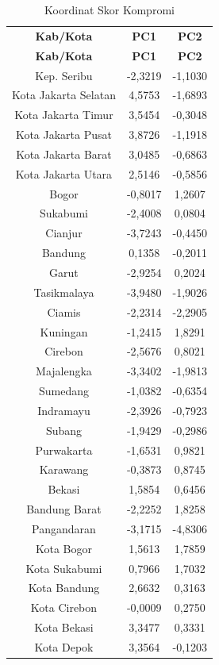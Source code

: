 \begin{longtable}{|c|c|c|}
\caption{Koordinat Skor Kompromi} \label{tab:scores} \\\\
\hline
\textbf{Kab/Kota} & \textbf{PC1} & \textbf{PC2} \\
\hline
\endfirsthead
\hline
\textbf{Kab/Kota} & \textbf{PC1} & \textbf{PC2} \\
\hline
\endhead
\hline
\endfoot
Kep. Seribu & -2,3219 & -1,1030 \\
Kota Jakarta Selatan & 4,5753 & -1,6893 \\
Kota Jakarta Timur & 3,5454 & -0,3048 \\
Kota Jakarta Pusat & 3,8726 & -1,1918 \\
Kota Jakarta Barat & 3,0485 & -0,6863 \\
Kota Jakarta Utara & 2,5146 & -0,5856 \\
Bogor & -0,8017 & 1,2607 \\
Sukabumi & -2,4008 & 0,0804 \\
Cianjur & -3,7243 & -0,4450 \\
Bandung & 0,1358 & -0,2011 \\
Garut & -2,9254 & 0,2024 \\
Tasikmalaya & -3,9480 & -1,9026 \\
Ciamis & -2,2314 & -2,2905 \\
Kuningan & -1,2415 & 1,8291 \\
Cirebon & -2,5676 & 0,8021 \\
Majalengka & -3,3402 & -1,9813 \\
Sumedang & -1,0382 & -0,6354 \\
Indramayu & -2,3926 & -0,7923 \\
Subang & -1,9429 & -0,2986 \\
Purwakarta & -1,6531 & 0,9821 \\
Karawang & -0,3873 & 0,8745 \\
Bekasi & 1,5854 & 0,6456 \\
Bandung Barat & -2,2252 & 1,8258 \\
Pangandaran & -3,1715 & -4,8306 \\
Kota Bogor & 1,5613 & 1,7859 \\
Kota Sukabumi & 0,7966 & 1,7032 \\
Kota Bandung & 2,6632 & 0,3163 \\
Kota Cirebon & -0,0009 & 0,2750 \\
Kota Bekasi & 3,3477 & 0,3331 \\
Kota Depok & 3,3564 & -0,1203 \\

\end{longtable}
